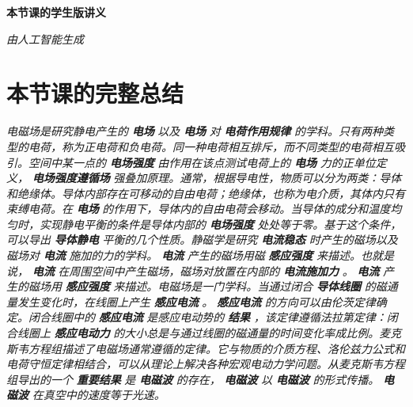 \documentclass{article}%
\begin{document}
%
\normalsize%
\pagestyle{header}%
\begin{minipage}{\textwidth}%
\centering%
\begin{Large}%
\textbf{本节课的学生版讲义}%
\end{Large}%
\linebreak%
\begin{large}%
\textit{由人工智能生成}%
\end{large}%
\end{minipage}%
\section{本节课的完整总结}%
\label{sec:AllSummary}%
\textit{电磁场是研究静电产生的}%
\textbf{\textit{电场}}%
\textit{以及}%
\textbf{\textit{电场}}%
\textit{对}%
\textbf{\textit{电荷作用规律}}%
\textit{的学科。只有两种类型的电荷，称为正电荷和负电荷。同一种电荷相互排斥，而不同类型的电荷相互吸引。空间中某一点的}%
\textbf{\textit{电场强度}}%
\textit{由作用在该点测试电荷上的}%
\textbf{\textit{电场}}%
\textit{力的正单位定义，}%
\textbf{\textit{电场强度遵循场}}%
\textit{强叠加原理。通常，根据导电性，物质可以分为两类：导体和绝缘体。导体内部存在可移动的自由电荷；绝缘体，也称为电介质，其体内只有束缚电荷。在}%
\textbf{\textit{电场}}%
\textit{的作用下，导体内的自由电荷会移动。当导体的成分和温度均匀时，实现静电平衡的条件是导体内部的}%
\textbf{\textit{电场强度}}%
\textit{处处等于零。基于这个条件，可以导出}%
\textbf{\textit{导体静电}}%
\textit{平衡的几个性质。静磁学是研究}%
\textbf{\textit{电流稳态}}%
\textit{时产生的磁场以及磁场对}%
\textbf{\textit{电流}}%
\textit{施加的力的学科。}%
\textbf{\textit{电流}}%
\textit{产生的磁场用磁}%
\textbf{\textit{感应强度}}%
\textit{来描述。也就是说，}%
\textbf{\textit{电流}}%
\textit{在周围空间中产生磁场，磁场对放置在内部的}%
\textbf{\textit{电流施加力}}%
\textit{。}%
\textbf{\textit{电流}}%
\textit{产生的磁场用}%
\textbf{\textit{感应强度}}%
\textit{来描述。电磁场是一门学科。当通过闭合}%
\textbf{\textit{导体线圈}}%
\textit{的磁通量发生变化时，在线圈上产生}%
\textbf{\textit{感应电流}}%
\textit{。}%
\textbf{\textit{感应电流}}%
\textit{的方向可以由伦茨定律确定。闭合线圈中的}%
\textbf{\textit{感应电流}}%
\textit{是感应电动势的}%
\textbf{\textit{结果}}%
\textit{，该定律遵循法拉第定律：闭合线圈上}%
\textbf{\textit{感应电动力}}%
\textit{的大小总是与通过线圈的磁通量的时间变化率成比例。麦克斯韦方程组描述了电磁场通常遵循的定律。它与物质的介质方程、洛伦兹力公式和电荷守恒定律相结合，可以从理论上解决各种宏观电动力学问题。从麦克斯韦方程组导出的一个}%
\textbf{\textit{重要结果}}%
\textit{是}%
\textbf{\textit{电磁波}}%
\textit{的存在，}%
\textbf{\textit{电磁波}}%
\textit{以}%
\textbf{\textit{电磁波}}%
\textit{的形式传播。}%
\textbf{\textit{电磁波}}%
\textit{在真空中的速度等于光速。}
\end{document}
